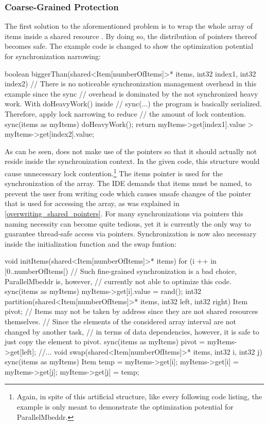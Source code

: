 \subsubsection{Coarse-Grained Protection}
The first solution to the aforementioned problem is to wrap the whole array of items inside a shared resource . By doing so, the distribution of pointers thereof becomes safe. The example code is changed to show the optimization potential for synchronization narrowing:
\begin{ccode}
boolean biggerThan(shared<Item[numberOfItems]>* items, int32 index1, int32 index2) { 
  // There is no noticeable synchronization management overhead in this example since the sync 
  // overhead is dominated by the not synchronized heavy work. With doHeavyWork() inside 
  // sync(...) the program is basically serialized. Therefore, apply lock narrowing to reduce 
  // the amount of lock contention. 
  sync(items as myItems) { 
    doHeavyWork(); 
    return myItems->get[index1].value > myItems->get[index2].value; 
  }
}
\end{ccode}
As can be seen,  does not make use of the  pointers so that it should actually not reside inside the synchronization context. In the given code, this structure would cause unnecessary lock contention.\footnote{Again, in spite of this artificial structure, like every following code listing, the example is only meant to demonstrate the optimization potential for ParallelMbeddr.} The items pointer is used for the synchronization of the array. The IDE demands that items must be named, to prevent the user from writing code which causes unsafe changes of the pointer that is used for accessing the array, as was explained in \ref{overwriting_shared_pointers}. For many synchronizations via pointers this naming necessity can become quite tedious, yet it is currently the only way to guarantee thread-safe access via pointers. Synchronization is now also necessary inside the initialization function and the swap funtion:
\begin{ccode}
void initItems(shared<Item[numberOfItems]>* items) { 
  for (i ++ in [0..numberOfItems[) {
    // Such fine-grained synchronization is a bad choice, ParallelMbeddr is, however,
    // currently not able to optimize this code.
    sync(items as myItems) { myItems->get[i].value = rand(); } 
  }
}
int32 partition(shared<Item[numberOfItems]>* items, int32 left, int32 right) { 
  Item pivot;
  // Items may not be taken by address since they are not shared resources themselves.
  // Since the elements of the considered array interval are not changed by another task,
  // in terms of data dependencies, however, it is safe to just copy the element to pivot.
  sync(items as myItems) { pivot = myItems->get[left]; } 
  //...
}
void swap(shared<Item[numberOfItems]>* items, int32 i, int32 j) { 
  sync(items as myItems) { 
    Item temp = myItems->get[i]; 
    myItems->get[i] = myItems->get[j]; 
    myItems->get[j] = temp; 
  } 
}
\end{ccode}

